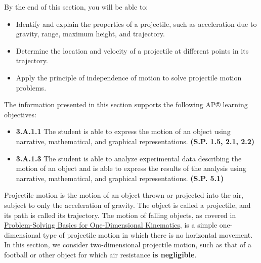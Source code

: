 \documentclass[
]{book}
\providecommand{\tightlist}{%
  \setlength{\itemsep}{0pt}\setlength{\parskip}{0pt}}
\begin{document}
By the end of this section, you will be able to:

\begin{itemize}
\tightlist
\item
  Identify and explain the properties of a projectile, such as
  acceleration due to gravity, range, maximum height, and trajectory.
\item
  Determine the location and velocity of a projectile at different
  points in its trajectory.
\item
  Apply the principle of independence of motion to solve projectile
  motion problems.
\end{itemize}

The information presented in this section supports the following AP®
learning objectives:

\begin{itemize}
\tightlist
\item
  \textbf{3.A.1.1} The student is able to express the motion of an object
  using narrative, mathematical, and graphical representations.
  \textbf{(S.P. 1.5, 2.1, 2.2)}
\item
  \textbf{3.A.1.3} The student is able to analyze experimental data
  describing the motion of an object and is able to express the
  results of the analysis using narrative, mathematical, and graphical
  representations. \textbf{(S.P. 5.1)}
\end{itemize}

\protect\hypertarget{import-auto-id1560216}{}{Projectile motion} is the
\protect\hypertarget{import-auto-id1846113}{}{motion} of an object thrown or
projected into the air, subject to only the acceleration of gravity. The
object is called a \protect\hypertarget{import-auto-id1809247}{}{projectile}, and its path is called its
\protect\hypertarget{import-auto-id1397020}{}{trajectory}. The motion of
falling objects, as covered in \href{/m54774}{Problem-Solving Basics for
One-Dimensional Kinematics}, is a simple one-dimensional type
of projectile motion in which there is no horizontal movement. In this
section, we consider two-dimensional projectile motion, such as that of
a football or other object for which \protect\hypertarget{import-auto-id1230666}{}{air
resistance} \textbf{is negligible}.
\end{document}
